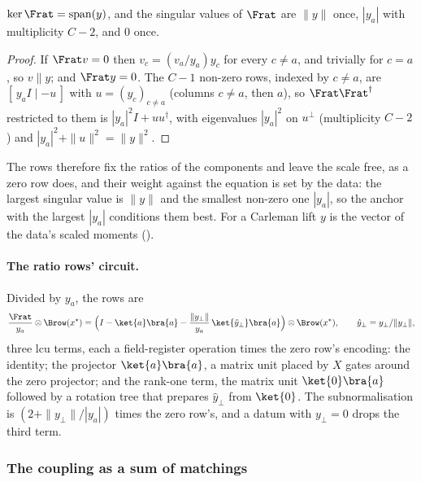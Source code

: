 \begin{proposition}
\label{prop:ratio-rows}
$\ker\Frat=\operatorname{span}(y)$, and the singular values of $\Frat$ are $\|y\|$ once, $|y_a|$ with multiplicity $C-2$, and $0$ once.
\end{proposition}
\begin{proof}
If $\Frat v=0$ then $v_c=(v_a/y_a)y_c$ for every $c\ne a$, and trivially for $c=a$, so $v\parallel y$; and $\Frat y=0$. The $C-1$ non-zero rows, indexed by $c\ne a$, are $[\,y_aI\mid-u\,]$ with $u=(y_c)_{c\ne a}$ (columns $c\ne a$, then $a$), so $\Frat\Frat^\dagger$ restricted to them is $|y_a|^2I+uu^\dagger$, with eigenvalues $|y_a|^2$ on $u^\perp$ (multiplicity $C-2$) and $|y_a|^2+\|u\|^2=\|y\|^2$.
\end{proof}
The rows therefore fix the ratios of the components and leave the scale free, as a zero row does, and their weight against the equation is set by the data: the largest singular value is $\|y\|$ and the smallest non-zero one $|y_a|$, so the anchor with the largest $|y_a|$ conditions them best. For a Carleman lift $y$ is the vector of the data's scaled moments ().

\paragraph{The ratio rows' circuit.} Divided by $y_a$, the rows are
\begin{equation}
    \frac{\Frat}{y_a}\otimes\Brow(x^*)
    =\Bigl(I-\ket{a}\bra{a}-\frac{\|y_\perp\|}{y_a}\,\ket{\hat y_\perp}\bra{a}\Bigr)\otimes\Brow(x^*),
    \qquad \hat y_\perp=y_\perp/\|y_\perp\|,
\end{equation}
three \gls{lcu} terms, each a field-register operation times the zero row's encoding: the identity; the projector $\ket{a}\bra{a}$, a matrix unit placed by $X$ gates around the zero projector; and the rank-one term, the matrix unit $\ket{0}\bra{a}$ followed by a rotation tree that prepares $\hat y_\perp$ from $\ket{0}$. The subnormalisation is $(2+\|y_\perp\|/|y_a|)$ times the zero row's, and a datum with $y_\perp=0$ drops the third term.

\subsubsection{The coupling as a sum of matchings}
\label{app:matchings}

